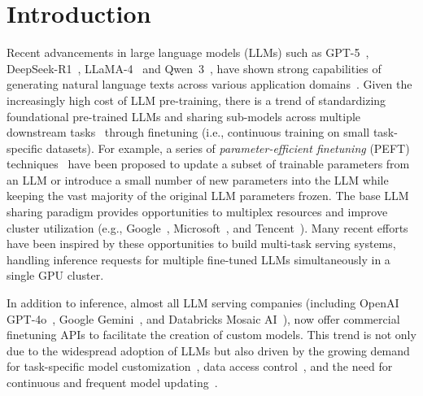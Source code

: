 \section{Introduction}
\label{flexllm:sec:intro}
%
Recent advancements in large language models (LLMs) such as GPT-5~\cite{gpt5,openai2023gpt4}, DeepSeek-R1~\cite{guo2025deepseek}, LLaMA-4~\cite{touvron2023llama,llama3,llama4} and Qwen~3~\cite{qwen2025qwen25technicalreport,yang2025qwen3technicalreport}, have shown strong capabilities of generating natural language texts across various application domains~\cite{zhang2019pretraining,liu2021makes,stiennon2020learning,dosovitskiy2020image}.
%
Given the increasingly high cost of LLM pre-training, there is a trend of standardizing foundational pre-trained LLMs and sharing sub-models across multiple downstream tasks~\cite{houlsby2019parameter,zhang2021share} through finetuning (i.e., continuous training on small task-specific datasets). For example, a series of {\em parameter-efficient finetuning} (PEFT) techniques~\cite{houlsby2019parameter,li2021prefix,pfeiffer2020adapterfusion,hu2021lora,he2021towards,lester2021power} have been proposed to update a subset of trainable parameters from an LLM or introduce a small number of new parameters into the LLM while keeping the vast majority of the original LLM parameters frozen. The base LLM sharing paradigm provides opportunities to multiplex resources and improve cluster utilization (e.g., Google~\cite{barham2022pathways}, Microsoft~\cite{hu2021lora}, and Tencent~\cite{nie2023angel}).
Many recent efforts~\cite{zhou2022pets,wu2024dlora,sheng2023s,chen2023punica,zhao2024lora,iliakopoulou2024chameleon} have been inspired by these opportunities to build multi-task serving systems, handling inference requests for multiple fine-tuned LLMs simultaneously in a single GPU cluster.

In addition to inference, almost all LLM serving companies (including OpenAI GPT-4o~\cite{openaifinetuning}, Google Gemini~\cite{googlefinetuning}, and Databricks Mosaic AI~\cite{databricksfinetuning}), now offer commercial finetuning APIs to facilitate the creation of custom models.
This trend is not only due to the widespread adoption of LLMs but also driven by the growing demand for task-specific model customization~\cite{liu2024customizing}, data access control~\cite{tan2024democratizing}, and the need for continuous and frequent model updating~\cite{gao2023unified}.

